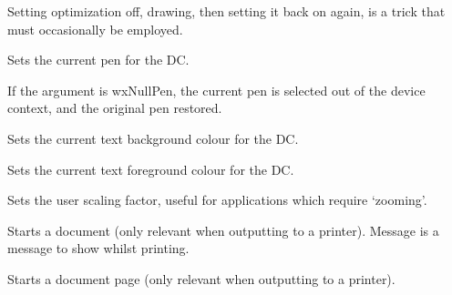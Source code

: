 Setting optimization off, drawing, then setting it back on again, is a trick
that must occasionally be employed.

\label{wxdcsetpen}


Sets the current pen for the DC.

If the argument is wxNullPen, the current pen is selected out of the device
context, and the original pen restored.

\label{wxdcsettextbackground}


Sets the current text background colour for the DC.

\label{wxdcsettextforeground}


Sets the current text foreground colour for the DC.

\label{wxdcsetuserscale}


Sets the user scaling factor, useful for applications which require
`zooming'.

\label{wxdcstartdoc}


Starts a document (only relevant when outputting to a printer).
Message is a message to show whilst printing.

\label{wxdcstartpage}


Starts a document page (only relevant when outputting to a printer).

